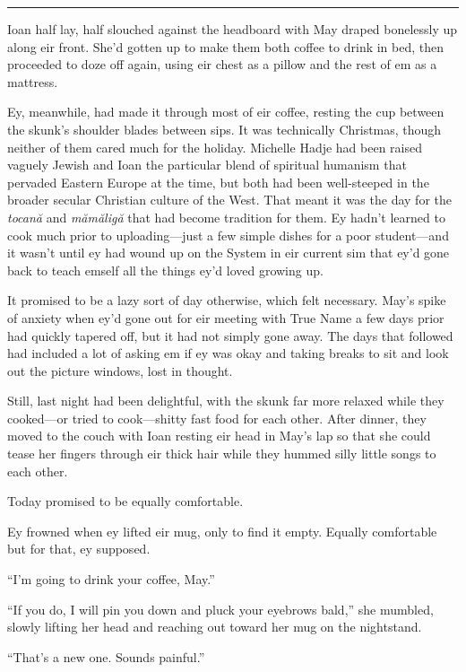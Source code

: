 \begin{center}\rule{0.5\linewidth}{0.5pt}\end{center}

Ioan half lay, half slouched against the headboard with May draped bonelessly up along eir front. She'd gotten up to make them both coffee to drink in bed, then proceeded to doze off again, using eir chest as a pillow and the rest of em as a mattress.

Ey, meanwhile, had made it through most of eir coffee, resting the cup between the skunk's shoulder blades between sips. It was technically Christmas, though neither of them cared much for the holiday. Michelle Hadje had been raised vaguely Jewish and Ioan the particular blend of spiritual humanism that pervaded Eastern Europe at the time, but both had been well-steeped in the broader secular Christian culture of the West. That meant it was the day for the \emph{tocană} and \emph{mămăligă} that had become tradition for them. Ey hadn't learned to cook much prior to uploading—just a few simple dishes for a poor student—and it wasn't until ey had wound up on the System in eir current sim that ey'd gone back to teach emself all the things ey'd loved growing up.

It promised to be a lazy sort of day otherwise, which felt necessary. May's spike of anxiety when ey'd gone out for eir meeting with True Name a few days prior had quickly tapered off, but it had not simply gone away. The days that followed had included a lot of asking em if ey was okay and taking breaks to sit and look out the picture windows, lost in thought.

Still, last night had been delightful, with the skunk far more relaxed while they cooked—or tried to cook—shitty fast food for each other. After dinner, they moved to the couch with Ioan resting eir head in May's lap so that she could tease her fingers through eir thick hair while they hummed silly little songs to each other.

Today promised to be equally comfortable.

Ey frowned when ey lifted eir mug, only to find it empty. Equally comfortable but for that, ey supposed.

``I'm going to drink your coffee, May.''

``If you do, I will pin you down and pluck your eyebrows bald,'' she mumbled, slowly lifting her head and reaching out toward her mug on the nightstand.

``That's a new one. Sounds painful.''

